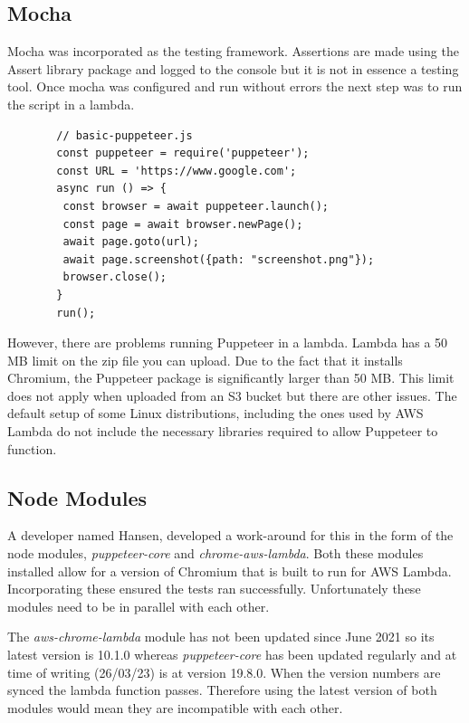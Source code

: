 \documentclass[12pt,a4paper,titlepage]{report}
\begin{document}
\subsection{Mocha}

Mocha was incorporated as the testing framework. Assertions are made using the Assert library package and logged to the console but it is not in essence a testing tool.
Once mocha was configured and run without errors the next step was to run the script in a lambda.

\begin{figure}[H]
 \begin{tcolorbox}
  \begin{verbatim}
  // basic-puppeteer.js
  const puppeteer = require('puppeteer');
  const URL = 'https://www.google.com';
  async run () => {
   const browser = await puppeteer.launch();
   const page = await browser.newPage();
   await page.goto(url);
   await page.screenshot({path: "screenshot.png"});
   browser.close();
  }
  run();
\end{verbatim}
\end{tcolorbox}
\end{figure}
However, there are problems running Puppeteer in a lambda. Lambda has a 50 MB limit on the zip file you can upload. 
Due to the fact that it installs Chromium, the Puppeteer package is significantly larger than 50 {MB}. This 
limit does not apply when uploaded from an \ac{S3} bucket but there are other issues. 
The default setup of some Linux distributions, including the ones used by AWS Lambda do not include the necessary libraries required to allow Puppeteer to function.

\subsection{Node Modules}

A developer named Hansen\autocite{Hansen}, developed a work-around for this in the form of the node modules, \textit{puppeteer-core} and \textit{chrome-aws-lambda}.
Both these modules installed allow for a version of Chromium that is built to run for AWS Lambda. Incorporating
these ensured the tests ran successfully. Unfortunately these modules need to be in parallel with each other.

The \textit{aws-chrome-lambda} module has not been updated since June 2021 so its latest version is 10.1.0 whereas
\textit{puppeteer-core} has been updated regularly and at time of writing (26/03/23) is at version 19.8.0. When the version numbers are
synced the lambda function passes. Therefore using the latest version of both modules would mean they are incompatible with each other.
\end{document}

